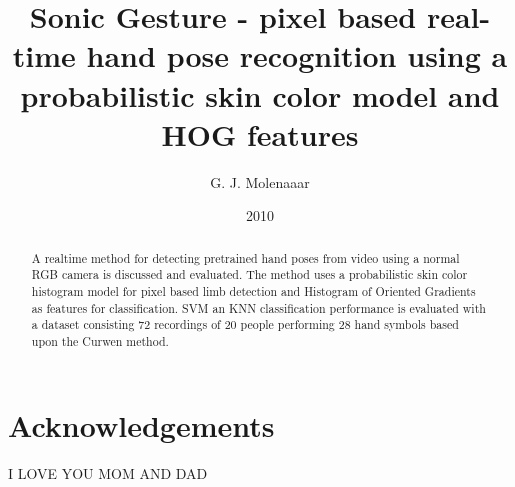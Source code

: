 \documentclass[a4paper]{report}
\begin{document}
\title{Sonic Gesture - pixel based real-time hand pose recognition using a probabilistic skin color model and HOG features}
\author{G. J. Molenaaar}
\date{2010}

\maketitle{}

\newpage{}

\begin{abstract}
A real\-time method for detecting pre\-trained hand poses from
video using a normal RGB camera is discussed and evaluated. The method uses a probabilistic skin color histogram model for pixel based limb detection and Histogram of Oriented Gradients as features for classification. SVM an KNN classification performance is evaluated with a dataset consisting 72 recordings of 20 people performing 28 hand symbols based upon the Curwen method. 
\end{abstract}
\newpage{}

\tableofcontents{}
\listoffigures{}
\listoftables{}

\chapter*{Acknowledgements}
I LOVE YOU MOM AND DAD
















\end{document}

